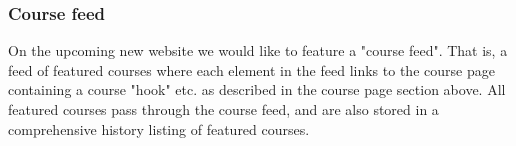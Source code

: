 \subsubsection{Course feed}
On the upcoming new website we would like to feature a "course feed". That is, a feed of featured courses where each element in the feed links to the course page containing a course "hook" etc. as described in the course page section above. All featured courses pass through the course feed, and are also stored in a comprehensive history listing of featured courses.



